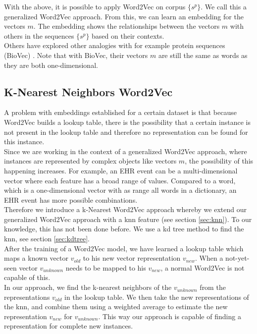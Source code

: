 With the above, it is possible to apply Word2Vec on corpus $\{s^p\}$. We call this a generalized Word2Vec approach. From this, we can learn an embedding for the vectors $m$. The embedding shows the relationships between the vectors $m$ with others in the sequences $\{s^p\}$ based on their contexts. \\
Others have explored other analogies with for example protein sequences (BioVec) \cite{protvec:article}. Note that with BioVec, their vectors $m$ are still the same as words as they are both one-dimensional.


\subsection{K-Nearest Neighbors Word2Vec}
\label{sec:knnWord2Vec}

A problem with embeddings established for a certain dataset is that because Word2Vec builds a lookup table, there is the possibility that a certain instance is not present in the lookup table and therefore no representation can be found for this instance. \\ 
Since we are working in the context of a generalized Word2Vec approach, where instances are represented by complex objects like vectors $m$, the possibility of this happening increases. For example, an EHR event can be a multi-dimensional vector where each feature has a broad range of values. Compared to a word, which is a one-dimensional vector with as range all words in a dictionary, an EHR event has more possible combinations. \\

Therefore we introduce a k-Nearest Word2Vec approach whereby we extend our generalized Word2Vec approach with a knn feature (see section \ref{sec:knn}). To our knowledge, this has not been done before. We use a kd tree method to find the knn, see section \ref{sec:kdtree}. \\

After the training of a Word2Vec model, we have learned a lookup table which maps a known vector $v_{old}$ to his new vector representation $v_{new}$. When a not-yet-seen vector $v_{unknown}$ needs to be mapped to his $v_{new}$, a normal Word2Vec is not capable of this. \\
In our approach, we find the k-nearest neighbors of the $v_{unknown}$ from the representations $v_{old}$ in the lookup table. We then take the new representations of the knn, and combine them using a weighted average to estimate the new representation $v_{new}$ for $v_{unknown}$. This way our approach is capable of finding a representation for complete new instances. \\

